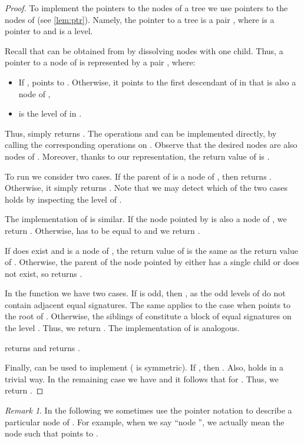\documentclass[a4paper]{article}
\theoremstyle{remark}
\newtheorem{remark}[theorem]{Remark}
\begin{document}
\begin{proof}
To implement the pointers to the nodes of a tree  we use pointers to the nodes of  (see \cref{lem:ptr}).
Namely, the pointer  to a tree  is a pair , where  is a pointer to  and  is a level.

Recall that  can be obtained from  by dissolving nodes with one child.
Thus, a pointer  to a node  of  is represented by a pair , where:
\begin{itemize}
\item If ,  points to . Otherwise, it points to the first descendant
  of  in  that is also a node of ,
\item  is the level of  in .
\end{itemize}

Thus,  simply returns .
The operations  and  can be implemented directly, by calling the corresponding operations on .
Observe that the desired nodes are also nodes of .
Moreover, thanks to our representation, the return value of  is .

To run  we consider two cases.
If the parent of  is a node of , then  returns .
Otherwise, it simply returns .
Note that we may detect which of the two cases holds by inspecting the level of .

The implementation of  is similar.
If the node pointed by  is also a node of , we return .
Otherwise,  has to be equal to  and we return .

If  does exist and is a node of , the return value of  is the same as the return value of .
Otherwise, the parent of the node pointed by  either has a single child or does not exist, so  returns .

In the function  we have two cases.
If  is odd, then , as the odd
levels of  do not contain adjacent equal signatures.
The same applies to the case when  points to the root of .
Otherwise, the siblings of  constitute a block of equal signatures
on the level .
Thus, we return .
The implementation of  is analogous.

 returns  and  returns .

Finally,  can be used to implement  ( is symmetric).
If , then .
Also,  holds in a trivial way.
In the remaining case we have  and it follows that 
for .
Thus, we return .
\end{proof}

\begin{remark}
In the following we sometimes use the pointer notation
to describe a particular node of .
For example, when we say ``node '', we actually
mean the node  such that  points to .
\end{remark}
\end{document}
